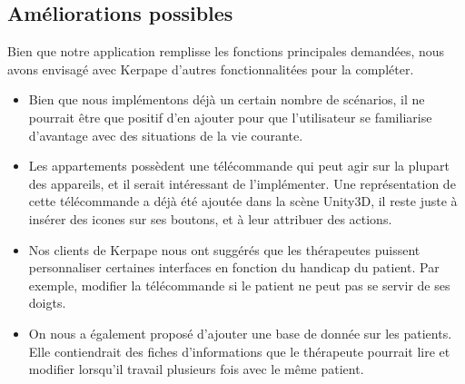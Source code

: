 \subsection{Améliorations possibles}

Bien que notre application remplisse les fonctions principales demandées, nous avons envisagé avec Kerpape d'autres fonctionnalitées pour la compléter.
\begin{itemize}
\item Bien que nous implémentons déjà un certain nombre de scénarios, il ne pourrait être que positif d'en ajouter pour que l'utilisateur se familiarise d'avantage avec des situations de la vie courante.
\item Les appartements possèdent une télécommande qui peut agir sur la plupart des appareils, et il serait intéressant de l'implémenter. Une représentation de cette télécommande a déjà été ajoutée dans la scène Unity3D, il reste juste à insérer des icones sur ses boutons, et à leur attribuer des actions.
\item Nos clients de Kerpape nous ont suggérés que les thérapeutes puissent personnaliser certaines interfaces en fonction du handicap du patient. Par exemple, modifier la télécommande si le patient ne peut pas se servir de ses doigts.
\item On nous a également proposé d'ajouter une base de donnée sur les patients. Elle contiendrait des fiches d'informations que le thérapeute pourrait lire et modifier lorsqu'il travail plusieurs fois avec le même patient.
\end{itemize}

